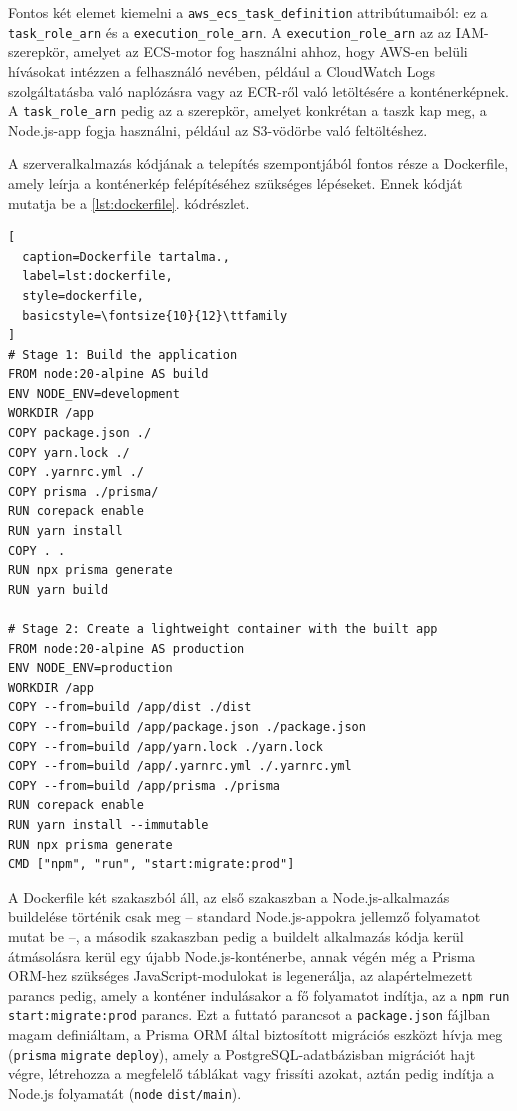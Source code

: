 Fontos két elemet kiemelni a \verb|aws_ecs_task_definition| attribútumaiból: ez a \verb|task_role_arn| és a \verb|execution_role_arn|. A \verb|execution_role_arn| az az IAM-szerepkör, amelyet az ECS-motor fog használni ahhoz, hogy AWS-en belüli hívásokat intézzen a felhasználó nevében, például a CloudWatch Logs szolgáltatásba való naplózásra vagy az ECR-ről való letöltésére a konténerképnek. A \verb|task_role_arn| pedig az a szerepkör, amelyet konkrétan a taszk kap meg, a Node.js-app fogja használni, például az S3-vödörbe való feltöltéshez.

A szerveralkalmazás kódjának a telepítés szempontjából fontos része a Dockerfile, amely leírja a konténerkép felépítéséhez szükséges lépéseket. Ennek kódját mutatja be a \ref{lst:dockerfile}. kódrészlet.

\begin{minipage}{0.92\textwidth}
  \begin{lstlisting}[
  caption=Dockerfile tartalma.,
  label=lst:dockerfile,
  style=dockerfile,
  basicstyle=\fontsize{10}{12}\ttfamily
]
# Stage 1: Build the application
FROM node:20-alpine AS build
ENV NODE_ENV=development
WORKDIR /app
COPY package.json ./
COPY yarn.lock ./
COPY .yarnrc.yml ./
COPY prisma ./prisma/
RUN corepack enable
RUN yarn install
COPY . .
RUN npx prisma generate
RUN yarn build

# Stage 2: Create a lightweight container with the built app
FROM node:20-alpine AS production
ENV NODE_ENV=production
WORKDIR /app
COPY --from=build /app/dist ./dist
COPY --from=build /app/package.json ./package.json
COPY --from=build /app/yarn.lock ./yarn.lock
COPY --from=build /app/.yarnrc.yml ./.yarnrc.yml
COPY --from=build /app/prisma ./prisma
RUN corepack enable
RUN yarn install --immutable
RUN npx prisma generate
CMD ["npm", "run", "start:migrate:prod"]
\end{lstlisting}
\end{minipage}

A Dockerfile két szakaszból áll, az első szakaszban a Node.js-alkalmazás buildelése történik csak meg -- standard Node.js-appokra jellemző folyamatot mutat be --, a második szakaszban pedig a buildelt alkalmazás kódja kerül átmásolásra kerül egy újabb Node.js-konténerbe, annak végén még a Prisma ORM-hez szükséges JavaScript-modulokat is legenerálja, az alapértelmezett parancs pedig, amely a konténer indulásakor a fő folyamatot indítja, az a \verb|npm| \verb|run| \verb|start:migrate:prod| parancs. Ezt a futtató parancsot a \verb|package.json| fájlban magam definiáltam, a Prisma ORM által biztosított migrációs eszközt hívja meg (\verb|prisma| \verb|migrate| \verb|deploy|), amely a PostgreSQL-adatbázisban migrációt hajt végre, létrehozza a megfelelő táblákat vagy frissíti azokat, aztán pedig indítja a Node.js folyamatát (\verb|node| \verb|dist/main|).

